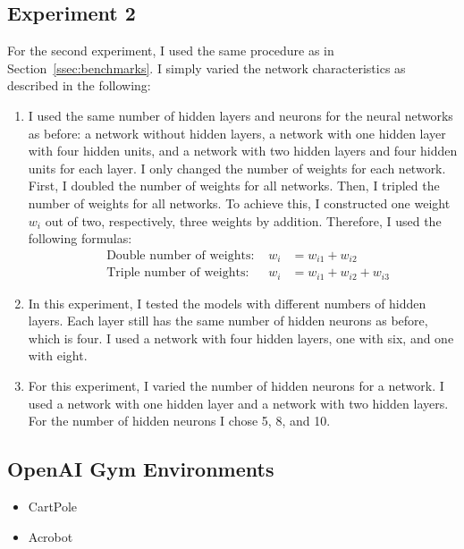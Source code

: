 \subsection{Experiment 2}
For the second experiment, I used the same procedure as in Section~\ref{ssec:benchmarks}. I simply varied the network characteristics as described in the following:
\begin{enumerate}
  \item I used the same number of hidden layers and neurons for the neural networks as before: a network without hidden layers, a network with one hidden layer with four hidden units, and a network with two hidden layers and four hidden units for each layer. I only changed the number of weights for each network. First, I doubled the number of weights for all networks. Then, I tripled the number of weights for all networks. To achieve this, I constructed one weight $w_i$ out of two, respectively, three weights by addition. Therefore, I used the following formulas:
  \begin{align*}
    &\text{Double number of weights: } &w_i &= w_{i1} + w_{i2} \\
    &\text{Triple number of weights: } &w_i &= w_{i1} + w_{i2} + w_{i3}
  \end{align*}
  \item In this experiment, I tested the models with different numbers of hidden layers. Each layer still has the same number of hidden neurons as before, which is four. I used a network with four hidden layers, one with six, and one with eight.
  \item For this experiment, I varied the number of hidden neurons for a network. I used a network with one hidden layer and a network with two hidden layers. For the number of hidden neurons I chose 5, 8, and 10.
\end{enumerate}

\subsection{OpenAI Gym Environments}
\begin{itemize}
  \item CartPole
  \item Acrobot
\end{itemize}


